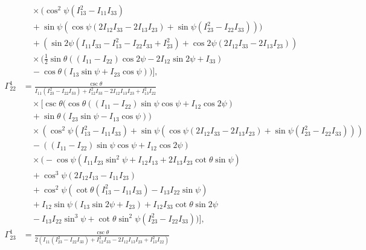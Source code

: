 \documentclass[pdflatex,sn-mathphys-num]{sn-jnl}%
\theoremstyle{thmstyleone}%
\theoremstyle{thmstyletwo}%
\theoremstyle{thmstylethree}%
\begin{document}
\begin{appendices}
\begin{align}
    &\quad \times \Big(\cos ^2\psi \left(I_{13}^2-I_{11} I_{33}\right) \nonumber \\
    &\quad +\sin \psi \left(\cos \psi (2 I_{12} I_{33}-2 I_{13} I_{23})+\sin \psi \left(I_{23}^2-I_{22} I_{33}\right)\right)\Big) \nonumber \\
    &\quad +\left(\sin 2\psi \left(I_{11} I_{33}-I_{13}^2-I_{22} I_{33}+I_{23}^2\right)+\cos 2\psi (2 I_{12} I_{33}-2 I_{13} I_{23})\right) \nonumber \\
    &\quad \times \bigg(\frac{1}{2} \sin \theta ((I_{11}-I_{22}) \cos 2\psi-2 I_{12} \sin 2\psi+I_{33}) \nonumber \\
    &\quad -\cos \theta (I_{13} \sin \psi+I_{23} \cos \psi)\bigg) \bigg], \nonumber \\
    \Gamma^{1}_{22} &= \frac{\csc \theta}{I_{11} \left(I_{23}^2-I_{22} I_{33}\right)+I_{12}^2 I_{33}-2 I_{12} I_{13} I_{23}+I_{13}^2 I_{22}} \nonumber \\
    &\quad \times \bigg[ \csc \theta \Big(\cos \theta ((I_{11}-I_{22}) \sin \psi \cos \psi+I_{12} \cos 2\psi) \nonumber \\
    &\quad +\sin \theta (I_{23} \sin \psi-I_{13} \cos \psi)\Big) \nonumber \\
    &\quad \times \left(\cos ^2\psi \left(I_{13}^2-I_{11} I_{33}\right)+\sin \psi \left(\cos \psi (2 I_{12} I_{33}-2 I_{13} I_{23})+\sin \psi \left(I_{23}^2-I_{22} I_{33}\right)\right)\right) \nonumber \\
    &\quad -((I_{11}-I_{22}) \sin \psi \cos \psi+I_{12} \cos 2\psi) \nonumber \\
    &\quad \times \bigg(-\cos \psi \left(I_{11} I_{23} \sin ^2\psi+I_{12} I_{13}+2 I_{13} I_{23} \cot \theta \sin \psi\right) \nonumber \\
    &\quad +\cos ^3\psi (2 I_{12} I_{13}-I_{11} I_{23}) \nonumber \\
    &\quad +\cos ^2\psi \left(\cot \theta \left(I_{13}^2-I_{11} I_{33}\right)-I_{13} I_{22} \sin \psi\right) \nonumber \\
    &\quad +I_{12} \sin \psi (I_{13} \sin 2\psi+I_{23}) +I_{12} I_{33} \cot \theta \sin 2\psi \nonumber \\
    &\quad -I_{13} I_{22} \sin ^3\psi+\cot \theta \sin ^2\psi \left(I_{23}^2-I_{22} I_{33}\right)\bigg) \bigg], \nonumber \\
    \Gamma^{1}_{23} &= \frac{\csc \theta}{2 \left(I_{11} \left(I_{23}^2-I_{22} I_{33}\right)+I_{12}^2 I_{33}-2 I_{12} I_{13} I_{23}+I_{13}^2 I_{22}\right)} \nonumber \\

\end{align}
\end{appendices}
\end{document}
